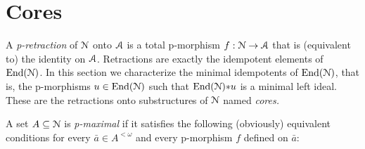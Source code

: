 
\section{Cores}

A \emph{p-retraction} of $\EuScript N$ onto $\EuScript A$ is a total p-morphism $f:\EuScript N\to\EuScript A$ that is (equivalent to) the identity on $\EuScript A$.
Retractions are exactly the idempotent elements of ${\rm End}(\EuScript N)$.
In this section we characterize the minimal idempotents of ${\rm End}(\EuScript N)$, that is, the p-morphisms $u\in{\rm End}(\EuScript N)$ such that ${\rm End}(\EuScript N){*}u$ is a minimal left ideal.
These are the retractions onto substructures of $\EuScript N$ named \textit{cores.}




A set $A\subseteq\EuScript N$ is \emph{p-maximal} if it satisfies the following (obviously) equivalent conditions for every $\bar a\in A^{<\omega}$ and every p-morphism $f$ defined on $\bar a$:

